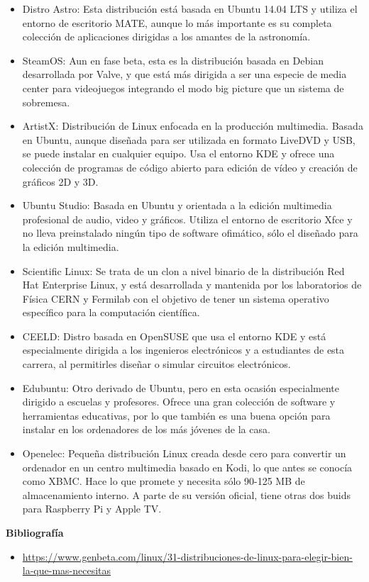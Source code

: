 \documentclass[11pt, a4paper]{report}
\begin{document}
\begin{itemize}
\item Distro Astro: Esta distribución está basada en Ubuntu 14.04 LTS y utiliza
  el entorno de escritorio MATE, aunque lo más importante es su completa
  colección de aplicaciones dirigidas a los amantes de la astronomía.
\item SteamOS: Aun en fase beta, esta es la distribución basada en Debian
  desarrollada por Valve, y que está más dirigida a ser una especie de media
  center para videojuegos integrando el modo big picture que un sistema de
  sobremesa.
\item ArtistX: Distribución de Linux enfocada en la producción multimedia.
  Basada en Ubuntu, aunque diseñada para ser utilizada en formato LiveDVD y
  USB, se puede instalar en cualquier equipo. Usa el entorno KDE y ofrece una
  colección de programas de código abierto para edición de vídeo y creación de
  gráficos 2D y 3D.
\item Ubuntu Studio: Basada en Ubuntu y orientada a la edición multimedia
  profesional de audio, video y gráficos. Utiliza el entorno de escritorio Xfce
  y no lleva preinstalado ningún tipo de software ofimático, sólo el diseñado
  para la edición multimedia.
\item Scientific Linux: Se trata de un clon a nivel binario de la distribución
  Red Hat Enterprise Linux, y está desarrollada y mantenida por los
  laboratorios de Física CERN y Fermilab con el objetivo de tener un sistema
  operativo específico para la computación científica.
\item CEELD: Distro basada en OpenSUSE que usa el entorno KDE y está
  especialmente dirigida a los ingenieros electrónicos y a estudiantes de esta
  carrera, al permitirles diseñar o simular circuitos electrónicos.
\item Edubuntu: Otro derivado de Ubuntu, pero en esta ocasión especialmente
  dirigido a escuelas y profesores. Ofrece una gran colección de software y
  herramientas educativas, por lo que también es una buena opción para instalar
  en los ordenadores de los más jóvenes de la casa.
\item Openelec: Pequeña distribución Linux creada desde cero para convertir un
  ordenador en un centro multimedia basado en Kodi, lo que antes se conocía
  como XBMC. Hace lo que promete y necesita sólo 90-125 MB de almacenamiento
  interno. A parte de su versión oficial, tiene otras dos buids para Raspberry
  Pi y Apple TV.
\end{itemize}

\newpage

\textbf{Bibliografía} \\

\begin{itemize}

\item \url{https://www.genbeta.com/linux/31-distribuciones-de-linux-para-elegir-bien-la-que-mas-necesitas}
\end{itemize}
\end{document}

